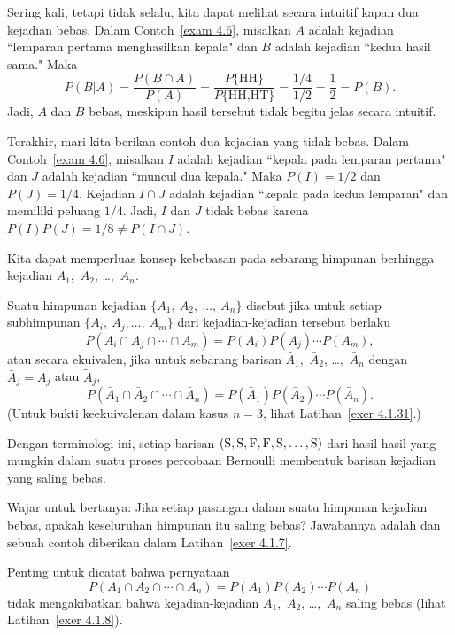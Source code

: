 \begin{example}\label{exam 4.7}
Sering kali, tetapi tidak selalu, kita dapat melihat secara intuitif kapan dua kejadian
bebas.  Dalam Contoh~\ref{exam 4.6}, misalkan $A$ adalah kejadian ``lemparan
pertama menghasilkan kepala" dan $B$ adalah kejadian ``kedua hasil sama." Maka
$$
P(B|A) = \frac {P(B \cap A)}{P(A)} = \frac {P\{\mbox {HH}\}}{P\{\mbox {HH,HT}\}} =
\frac {1/4}{1/2} = \frac 12 = P(B).
$$
Jadi, $A$ dan $B$ bebas, meskipun hasil tersebut tidak begitu jelas secara intuitif.
\end{example}

\begin{example}\label{exam 4.8}
Terakhir, mari kita berikan contoh dua kejadian yang tidak bebas. 
Dalam Contoh~\ref{exam 4.6}, misalkan $I$ adalah kejadian ``kepala pada lemparan pertama" dan $J$
adalah kejadian ``muncul dua kepala."  Maka $P(I) = 1/2$ dan $P(J) = 1/4$.  Kejadian
$I \cap J$ adalah kejadian ``kepala pada kedua lemparan" dan memiliki peluang $1/4$. 
Jadi, $I$ dan $J$ tidak bebas karena $P(I)P(J) = 1/8 \ne P(I \cap J)$.
\end{example}

Kita dapat memperluas konsep kebebasan pada sebarang himpunan berhingga kejadian
$A_1$,~$A_2$, \dots,~$A_n$.

\begin{definition}\label{def 4.3}
Suatu himpunan kejadian $\{A_1,\ A_2,\ \ldots,\ A_n\}$ disebut  jika untuk setiap
subhimpunan
$\{A_i,\ A_j,\ldots,\ A_m\}$ dari kejadian-kejadian tersebut berlaku
$$
P(A_i \cap A_j \cap\cdots\cap A_m) = P(A_i)P(A_j)\cdots P(A_m),
$$
atau secara ekuivalen, jika untuk sebarang barisan $\bar A_1$,~$\bar A_2$,
\dots,~$\bar A_n$ dengan $\bar A_j = A_j$ atau $\tilde A_j$,
$$
P(\bar A_1 \cap \bar A_2 \cap\cdots\cap \bar A_n) =
P(\bar A_1)P(\bar A_2)\cdots P(\bar A_n).
$$
(Untuk bukti keekuivalenan dalam kasus $n = 3$, 
lihat Latihan~\ref{exer 4.1.31}.)
\end{definition}
Dengan terminologi ini, setiap barisan  $(\mbox S,\mbox S,\mbox F,\mbox
F, \mbox S, \dots,\mbox S)$ dari hasil-hasil yang mungkin dalam suatu proses percobaan Bernoulli membentuk barisan kejadian yang saling
bebas.
\par
Wajar untuk bertanya: Jika setiap pasangan dalam suatu himpunan kejadian bebas, apakah keseluruhan himpunan itu
saling bebas?  Jawabannya adalah  dan sebuah contoh diberikan dalam
Latihan~\ref{exer 4.1.7}.
\par
Penting untuk dicatat bahwa pernyataan 
$$
P(A_1 \cap A_2 \cap \cdots \cap A_n) = P(A_1)P(A_2) \cdots P(A_n)
$$
tidak mengakibatkan bahwa kejadian-kejadian $A_1$,~$A_2$, \dots,~$A_n$ saling bebas (lihat
Latihan~\ref{exer 4.1.8}).

